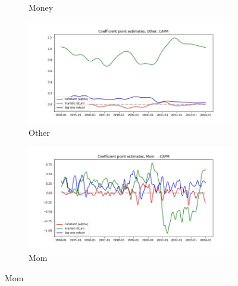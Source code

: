 \documentclass{article}
\begin{document}
\begin{figure}
\begin{subfigure}[b]{0.5\textwidth}
    \caption{Money}
    \label{fig:2}
  \end{subfigure}
  \begin{subfigure}[b]{0.5\textwidth}
    \centering
    \includegraphics[width=\textwidth]{Other/coeffs_CAPM.jpg}
    \caption{Other}
    \label{fig:2}
  \end{subfigure}
  \begin{subfigure}[b]{0.5\textwidth}
    \centering
    \includegraphics[width=\textwidth]{Mom/coeffs_CAPM.jpg}
    \caption{Mom}
    \label{fig:2}
  \end{subfigure}

\end{figure}
\end{document}
